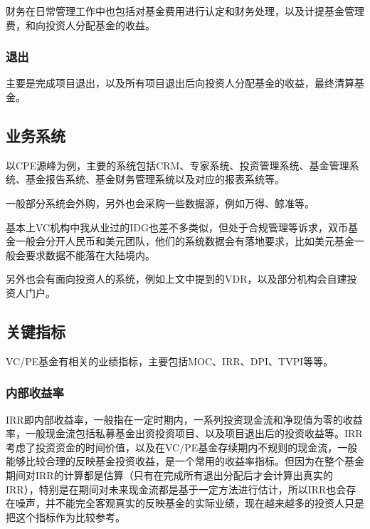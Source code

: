 \documentclass[
]{article}
\begin{document}
财务在日常管理工作中也包括对基金费用进行认定和财务处理，以及计提基金管理费，和向投资人分配基金的收益。

\hypertarget{ux9000ux51fa}{%
\subsubsection{退出}\label{ux9000ux51fa}}

主要是完成项目退出，以及所有项目退出后向投资人分配基金的收益，最终清算基金。

\hypertarget{ux4e1aux52a1ux7cfbux7edf}{%
\subsection{业务系统}\label{ux4e1aux52a1ux7cfbux7edf}}

以CPE源峰为例，主要的系统包括CRM、专家系统、投资管理系统、基金管理系统、基金报告系统、基金财务管理系统以及对应的报表系统等。

一般部分系统会外购，另外也会采购一些数据源，例如万得、鲸准等。

基本上VC机构中我从业过的IDG也差不多类似，但处于合规管理等诉求，双币基金一般会分开人民币和美元团队，他们的系统数据会有落地要求，比如美元基金一般会要求数据不能落在大陆境内。

另外也会有面向投资人的系统，例如上文中提到的VDR，以及部分机构会自建投资人门户。

\hypertarget{ux5173ux952eux6307ux6807}{%
\subsection{关键指标}\label{ux5173ux952eux6307ux6807}}

VC/PE基金有相关的业绩指标，主要包括MOC、IRR、DPI、TVPI等等。

\hypertarget{ux5185ux90e8ux6536ux76caux7387}{%
\subsubsection{内部收益率}\label{ux5185ux90e8ux6536ux76caux7387}}

IRR即内部收益率，一般指在一定时期内，一系列投资现金流和净现值为零的收益率，一般现金流包括私募基金出资投资项目、以及项目退出后的投资收益等。IRR考虑了投资资金的时间价值，以及在VC/PE基金存续期内不规则的现金流，一般能够比较合理的反映基金投资收益，是一个常用的收益率指标。但因为在整个基金期间对IRR的计算都是估算（只有在完成所有退出分配后才会计算出真实的IRR），特别是在期间对未来现金流都是基于一定方法进行估计，所以IRR也会存在噪声，并不能完全客观真实的反映基金的实际业绩，现在越来越多的投资人只是把这个指标作为比较参考。
\end{document}
